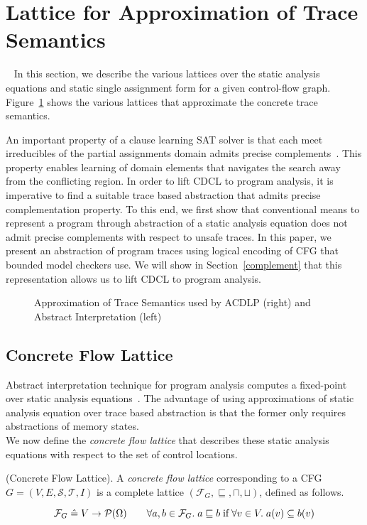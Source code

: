 %
\section{Lattice for Approximation of Trace Semantics}~\label{semantic-trace}
%
In this section, we describe the various lattices over the static analysis
equations and static single assignment form for a given control-flow graph.  
Figure~\ref{fig:lattice} shows the various lattices that approximate the
concrete trace semantics.
%


An important property of a clause learning SAT solver is that each meet
irreducibles of the partial assignments domain admits precise
complements~\cite{sas12}.  This property enables learning of domain 
elements that navigates the search away from the conflicting region.   
In order to lift CDCL to program analysis, it is imperative to find a suitable
trace based abstraction that admits precise complementation property. 
To this end, we first show that conventional means to represent a program through 
abstraction of a static analysis equation does not admit precise 
complements with respect to unsafe traces.   In this paper, we present an 
abstraction of program traces using logical encoding of CFG that bounded 
model checkers use.  We will show in Section~\ref{complement} that this 
representation allows us to lift CDCL to program analysis.  
%
%
\begin{figure}[htbp]
\centering
\vspace*{-0.2cm}
  \caption{Approximation of Trace Semantics used by ACDLP (right) and Abstract
  Interpretation (left)
  \label{fig:lattice}}
\end{figure}
%
\subsection{Concrete Flow Lattice}
%
Abstract interpretation technique for program analysis computes 
a fixed-point over static analysis equations~\cite{CC79,octagon}.  
The advantage of using approximations of static analysis equation 
over trace based abstraction is that the former only requires 
abstractions of memory states.  \\
%
We now define the \emph{concrete flow lattice} that describes these static 
analysis equations with respect to the set of control locations. 
%
\begin{definition} (Concrete Flow Lattice). A \emph{concrete flow lattice}
  corresponding to a CFG $G= (V, E, \mathcal{S}, \mathcal{T}, I)$  
  is a complete lattice $(\mathcal{F}_{G}, \sqsubseteq, \sqcap, \sqcup)$, 
  defined as follows. 
\end{definition}
  \[
    \mathcal{F}_{G} \mathrel{\hat=} V \rightarrow \mathcal{P}({\Omega}) \qquad \forall a,b \in
     \mathcal{F}_{G}.\; a \sqsubseteq b\; \text{if}\; \forall v \in V.\; a(v)
     \subseteq b(v) 
  \]

